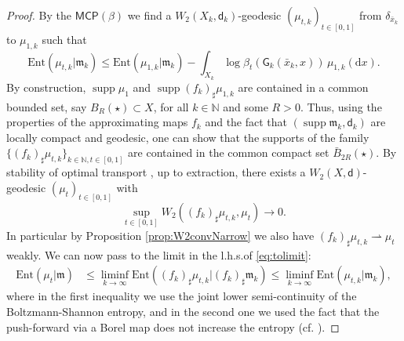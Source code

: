 \documentclass[11pt,a4paper]{article}
\theoremstyle{plain}
\theoremstyle{definition}
\theoremstyle{remark}
\numberwithin{equation}{section}
\newcommand{\N}{\mathbb{N}} %
\DeclareMathOperator{\supp}{\mathrm{supp}}
\newcommand{\MCP}{\mathsf{MCP}}
\newcommand{\Ent}{\mathrm{Ent}}
\newcommand{\di}{\mathrm{d}}
\newcommand{\mm}{\mathfrak m}
\newcommand{\sfd}{\mathsf d}
\newcommand{\sfG}{\mathsf G}
\begin{document}
\begin{proof}
By the $\MCP(\beta)$ we find a $W_2(X_k,\sfd_k)$-geodesic $(\mu_{t,k})_{t\in [0,1]}$ from $\delta_{\bar{x}_k}$ to $\mu_{1,k}$ such that
\begin{equation}\label{eq:tolimit}
\Ent(\mu_{t,k}|\mm_k)\leq \Ent(\mu_{1,k}|\mm_k) - \int_{X_k} \log\beta_t(\sfG_k(\bar{x}_k,x))\, \mu_{1,k}(\di x).
\end{equation}
By construction, $\supp\mu_1$ and $\supp(f_k)_\sharp \mu_{1,k}$ are contained in a common bounded set, say $B_R(\star)\subset X$, for all $k\in \N$ and some $R>0$. Thus, using the properties of the approximating maps $f_k$ and the fact that $(\supp\mm_k,\sfd_k)$ are locally compact and geodesic, one can show that the supports of the family $\{(f_k)_\sharp \mu_{t,k}\}_{k\in \N,t\in [0,1]}$ are contained in the common compact set $\bar{B}_{2R}(\star)$. By stability of optimal transport \cite[Thm.\@ 28.9]{Vil}, up to extraction, there exists a $W_2(X,\sfd)$-geodesic $(\mu_t)_{t\in[0,1]}$ with
\begin{equation}
\sup_{t\in [0,1]} W_2((f_k)_\sharp \mu_{t,k},\mu_t) \to 0.
\end{equation}
In particular by Proposition \ref{prop:W2convNarrow} we also have $(f_k)_\sharp\mu_{t,k} \rightharpoonup \mu_t$ weakly. We can now pass to the limit in the l.h.s.\@ of \eqref{eq:tolimit}:
\begin{align}
\Ent(\mu_t|\mm) & \leq \liminf_{k\to \infty} \Ent((f_k)_\sharp\mu_{t,k}|(f_{k})_\sharp \mm_k)  \leq \liminf_{k\to \infty} \Ent(\mu_{t,k}|\mm_k),
\end{align}
where in the first inequality we use the joint lower semi-continuity of the Boltzmann-Shannon entropy, and in the second one we used the fact that the push-forward via a Borel map does not increase the entropy (cf. \cite[Thm.\@ 29.20 (i), (ii)]{Vil}).


\end{proof}
\end{document}
